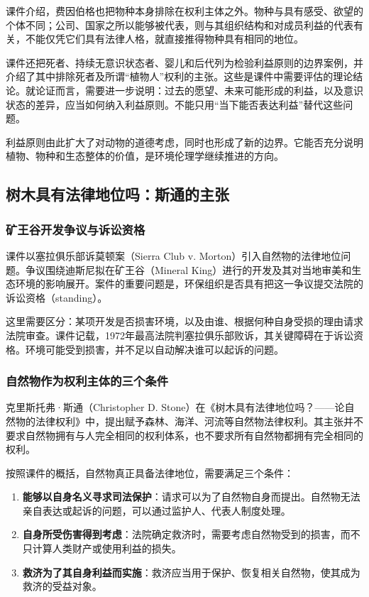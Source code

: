 \documentclass{ctexart}
\begin{document}
课件介绍，费因伯格也把物种本身排除在权利主体之外。物种与具有感受、欲望的个体不同；公司、国家之所以能够被代表，则与其组织结构和对成员利益的代表有关，不能仅凭它们具有法律人格，就直接推得物种具有相同的地位。

课件还把死者、持续无意识状态者、婴儿和后代列为检验利益原则的边界案例，并介绍了其中排除死者及所谓“植物人”权利的主张。这些是课件中需要评估的理论结论。就论证而言，需要进一步说明：过去的愿望、未来可能形成的利益，以及意识状态的差异，应当如何纳入利益原则。不能只用“当下能否表达利益”替代这些问题。

利益原则由此扩大了对动物的道德考虑，同时也形成了新的边界。它能否充分说明植物、物种和生态整体的价值，是环境伦理学继续推进的方向。

\subsection{树木具有法律地位吗：斯通的主张}

\subsubsection{矿王谷开发争议与诉讼资格}

课件以塞拉俱乐部诉莫顿案（Sierra Club v. Morton）引入自然物的法律地位问题。争议围绕迪斯尼拟在矿王谷（Mineral King）进行的开发及其对当地审美和生态环境的影响展开。案件的重要问题是，环保组织是否具有把这一争议提交法院的诉讼资格（standing）。

这里需要区分：某项开发是否损害环境，以及由谁、根据何种自身受损的理由请求法院审查。课件记载，1972年最高法院判塞拉俱乐部败诉，其关键障碍在于诉讼资格。环境可能受到损害，并不足以自动解决谁可以起诉的问题。

\subsubsection{自然物作为权利主体的三个条件}

克里斯托弗·斯通（Christopher D. Stone）在《树木具有法律地位吗？——论自然物的法律权利》中，提出赋予森林、海洋、河流等自然物法律权利。其主张并不要求自然物拥有与人完全相同的权利体系，也不要求所有自然物都拥有完全相同的权利。

按照课件的概括，自然物真正具备法律地位，需要满足三个条件：

\begin{enumerate}
    \item \textbf{能够以自身名义寻求司法保护}：请求可以为了自然物自身而提出。自然物无法亲自表达或起诉的问题，可以通过监护人、代表人制度处理。
    \item \textbf{自身所受伤害得到考虑}：法院确定救济时，需要考虑自然物受到的损害，而不只计算人类财产或使用利益的损失。
    \item \textbf{救济为了其自身利益而实施}：救济应当用于保护、恢复相关自然物，使其成为救济的受益对象。
\end{enumerate}
\end{document}
